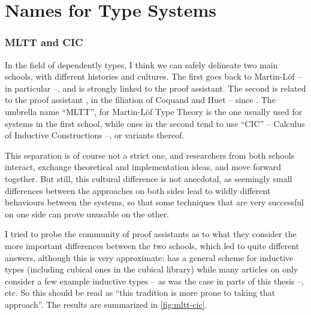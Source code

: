 \chapter{Names for Type Systems}
\label{chap:names}

\subsection*{MLTT and CIC}


In the field of dependently types, I think we can safely delineate two main schools,
with different histories and cultures. The first goes back to Martin-Löf –
in particular  –, and is strongly linked to the 
proof assistant. The second is related to the proof assistant , in the filiation of
Coquand and Huet – since .
The umbrella name “MLTT”, for Martin-Löf Type Theory is the one usually used for systems
in the first school, while ones in the second tend to use “CIC” – Calculus of Inductive
Constructions –, or variants thereof.

This separation is of course not a strict one,
and researchers from both schools interact, exchange
theoretical and implementation ideas, and move forward together. But still, this cultural
difference is not anecdotal, as seemingly small differences between the approaches on both
sides lead to wildly different behaviours between the systems, so that some techniques
that are very successful on one side can prove unusable on the other.

I tried to probe the community of proof assistants%
as to what they consider the more important differences between the two schools,
which led to quite different answers,
although this is very approximate:  has a general scheme for inductive types
(including cubical ones in the cubical library) while many articles on  only
consider a few example inductive types – as was the case in parts of this thesis –, etc.
So this should be read as “this tradition is more prone to taking that approach”.
The results are summarized in \cref{fig:mltt-cic}.

